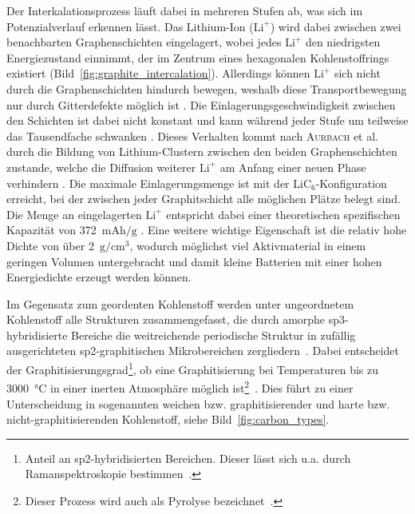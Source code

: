 Der Interkalationsprozess läuft dabei in mehreren Stufen ab, was sich im Potenzialverlauf erkennen lässt. Das Lithium-Ion ($\text{Li}^{+}$) wird dabei zwischen zwei benachbarten Graphenschichten eingelagert, wobei jedes $\text{Li}^{+}$ den niedrigsten Energiezustand einnimmt, der im Zentrum eines hexagonalen Kohlenstoffrings existiert \cite{Sole2014,Weng2023} (Bild~\ref{fig:graphite_intercalation}). Allerdings können $\text{Li}^{+}$ sich nicht durch die Graphenschichten hindurch bewegen, weshalb diese Transportbewegung nur durch Gitterdefekte möglich ist \cite{Nishidate2005}. Die Einlagerungsgeschwindigkeit zwischen den Schichten ist dabei nicht konstant und kann während jeder Stufe um teilweise das Tausendfache schwanken \cite{Levi1997}. Dieses Verhalten kommt nach \textsc{Aurbach} et al. durch die Bildung von Lithium-Clustern zwischen den beiden Graphenschichten zustande, welche die Diffusion weiterer $\text{Li}^{+}$ am Anfang einer neuen Phase verhindern \cite{Markevich2005}. Die maximale Einlagerungsmenge ist mit der $\text{LiC}_\text{6}$-Konfiguration erreicht, bei der zwischen jeder Graphitschicht alle möglichen Plätze belegt sind. Die Menge an eingelagerten $\text{Li}^{+}$ entspricht dabei einer theoretischen spezifischen Kapazität von 372~$\si{\mA \hour \per \g}$ \cite{Winter1998}. 
Eine weitere wichtige Eigenschaft ist die relativ hohe Dichte von über 2~$\si{\g \per \cm \cubed}$, wodurch möglichst viel Aktivmaterial in einem geringen Volumen untergebracht und damit kleine Batterien mit einer hohen Energiedichte erzeugt werden können.

Im Gegensatz zum geordenten Kohlenstoff werden unter ungeordnetem Kohlenstoff alle Strukturen zusammengefasst, die durch amorphe sp3-hybridisierte Bereiche die weitreichende periodische Struktur in zufällig ausgerichteten sp2-graphitischen Mikrobereichen zergliedern~\cite{Inagaki2014}. Dabei entscheidet der Graphitisierungsgrad\footnote{Anteil an sp2-hybridisierten Bereichen. Dieser lässt sich u.a. durch Ramanspektroskopie bestimmen~\cite{Yu2014}.}, ob eine Graphitisierung bei Temperaturen bis zu 3000~$\si{\degreeCelsius}$ in einer inerten Atmosphäre möglich ist\footnote{Dieser Prozess wird auch als Pyrolyse bezeichnet~\cite{Kim2017a}.}~\cite{Inagaki2014}. Dies führt zu einer Unterscheidung in sogenannten weichen bzw. graphitisierender und harte bzw. nicht-graphitisierenden Kohlenstoff, siehe Bild~\ref{fig:carbon_types}.

